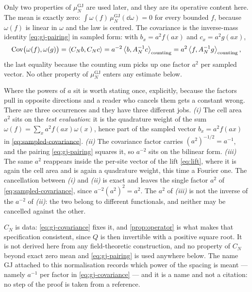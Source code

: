 Only two properties of $\mu^{\mathrm{GJ}}_N$ are used later, and they are its operative content here. The
mean is exactly zero: $\int\omega(f)\,\mu^{\mathrm{GJ}}_N(\dd\omega)=0$ for every bounded $f$, because
$\omega(f)$ is linear in $\omega$ and the law is centred. The covariance is the inverse-mass identity
\eqref{eq:gj-pairing} in sampled form: with $b_x=a^2f(ax)$ and $c_x=a^2g(ax)$,
\begin{equation}\label{eq:sampled-covariance}
  \operatorname{Cov}\bigl(\omega(f),\omega(g)\bigr)
  =\left\langle C_Nb, C_Nc \right\rangle
  =a^{-2}\left\langle b, A_N^{-1}c \right\rangle_{\mathrm{counting}}
  =a^2\left\langle f, A_N^{-1}g \right\rangle_{\mathrm{counting}} ,
\end{equation}
the last equality because the counting sum picks up one factor $a^2$ per sampled vector. No other
property of $\mu^{\mathrm{GJ}}_N$ enters any estimate below.

Where the powers of $a$ sit is worth stating once, explicitly, because the factors pull in opposite
directions and a reader who cancels them gets a constant wrong. There are three occurrences and they have
three different jobs. \emph{(i)} The cell area $a^2$ sits on the \emph{test evaluation}: it is the
quadrature weight of the sum $\omega(f)=\sum_xa^2f(ax)\omega(x)$, hence part of the sampled vector
$b_x=a^2f(ax)$ in \eqref{eq:sampled-covariance}. \emph{(ii)} The covariance factor carries
$(a^2)^{-1/2}=a^{-1}$, and the pairing \eqref{eq:gj-pairing} squares it, so $a^{-2}$ sits on the bilinear
form. \emph{(iii)} The
same $a^2$ reappears inside the per-site vector of the lift \eqref{eq:lift}, where it is again the cell
area and is again a quadrature weight, this time a Fourier one. The cancellation between \emph{(i)} and
\emph{(ii)} is exact and leaves the single factor $a^2$ of \eqref{eq:sampled-covariance}, since
$a^{-2}(a^2)^2=a^2$. The $a^2$ of \emph{(iii)} is not the inverse of the $a^{-2}$ of \emph{(ii)}: the two
belong to different functionals, and neither may be cancelled against the other.

\begin{remark}\label{rem:lattice-input}
$C_N$ is data: \eqref{eq:gj-covariance} fixes it, and \cref{prop:operator} is what makes that
specification consistent, since $Q$ is then invertible with a positive square root. It is not derived here
from any field-theoretic construction, and no property of $C_N$ beyond exact zero mean and
\eqref{eq:gj-pairing} is used anywhere below. The name GJ attached to this normalisation records which
power of the spacing is meant --- namely $a^{-1}$ per factor in \eqref{eq:gj-covariance} --- and it is a
name and not a citation: no step of the proof is taken from a reference.
\end{remark}

